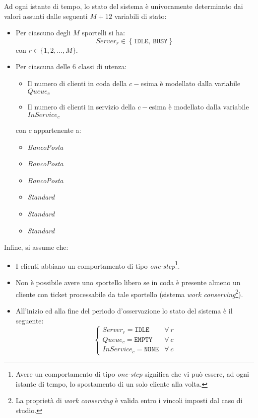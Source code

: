Ad ogni istante di tempo, lo stato del sistema è univocamente determinato dai valori assunti dalle seguenti $M + 12$ variabili di stato:
\begin{itemize}
\item Per ciascuno degli $M$ sportelli si ha:
\begin{equation}
Server_r \in
\left\lbrace \mathtt{IDLE},\ \mathtt{BUSY} \right\rbrace
\end{equation}
con $r \in \lbrace 1, 2, \dots, M \rbrace$.
\item Per ciascuna delle 6 classi di utenza:
\begin{itemize}
\item Il numero di clienti in coda della $c-$esima è modellato dalla variabile $Queue_{c}$
\item Il numero di clienti in servizio della $c-$esima è modellato dalla variabile $InService_{c}$
\end{itemize}
con $c$ appartenente a:
\begin{multicols}{2}
\begin{itemize}
\item \uo{} \textsl{BancoPosta}
\item \pp{} \textsl{BancoPosta}
\item \sr{} \textsl{BancoPosta}
\item \uo{} \textsl{Standard}
\item \pp{} \textsl{Standard}
\item \sr{} \textsl{Standard}
\end{itemize}
\end{multicols}
\end{itemize}

Infine, si assume che:
\begin{itemize}
\item I clienti abbiano un comportamento di tipo \textsl{one-step}\footnote{Avere un comportamento di tipo \textsl{one-step} significa che vi può essere, ad ogni istante di tempo, lo spostamento di un solo cliente alla volta.}.
\item Non è possibile avere uno sportello libero se in coda è presente almeno un cliente con ticket processabile da tale sportello (sistema \textsl{work conserving}\footnote{La proprietà di \textsl{work conserving} è valida entro i vincoli imposti dal caso di studio.}).
\item All'inizio ed alla fine del periodo d'osservazione lo stato del sistema è il seguente:
\begin{equation}
\begin{cases}
Server_r =\mathtt{IDLE} & \forall\ r \\[1em]
Queue_{c} = \mathtt{EMPTY} & \forall\ c \\[1em]
InService_{c} = \mathtt{NONE} & \forall\ c
\end{cases}
\end{equation}
\end{itemize}